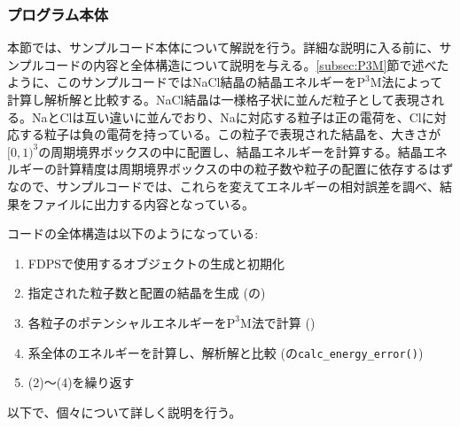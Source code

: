 \subsubsection{プログラム本体}
本節では、サンプルコード本体について解説を行う。詳細な説明に入る前に、サンプルコードの内容と全体構造について説明を与える。\ref{subsec:P3M}節で述べたように、このサンプルコードではNaCl結晶の結晶エネルギーを$\mathrm{P^{3}M}$法によって計算し解析解と比較する。NaCl結晶は一様格子状に並んだ粒子として表現される。NaとClは互い違いに並んでおり、Naに対応する粒子は正の電荷を、Clに対応する粒子は負の電荷を持っている。この粒子で表現された結晶を、大きさが$[0,1)^{3}$の周期境界ボックスの中に配置し、結晶エネルギーを計算する。結晶エネルギーの計算精度は周期境界ボックスの中の粒子数や粒子の配置に依存するはずなので、サンプルコードでは、これらを変えてエネルギーの相対誤差を調べ、結果をファイルに出力する内容となっている。

コードの全体構造は以下のようになっている:
\begin{enumerate}[leftmargin=*,itemsep=-1ex,label={(\arabic*)}]
\item FDPSで使用するオブジェクトの生成と初期化
\item 指定された粒子数と配置の結晶を生成 (\mainFunc の)
\item 各粒子のポテンシャルエネルギーを$\mathrm{P^{3}M}$法で計算 ()
\item 系全体のエネルギーを計算し、解析解と比較 (\mainFunc の\texttt{calc\_energy\_error()})
\item (2)〜(4)を繰り返す
\end{enumerate}

以下で、個々について詳しく説明を行う。

\ifCpp %
